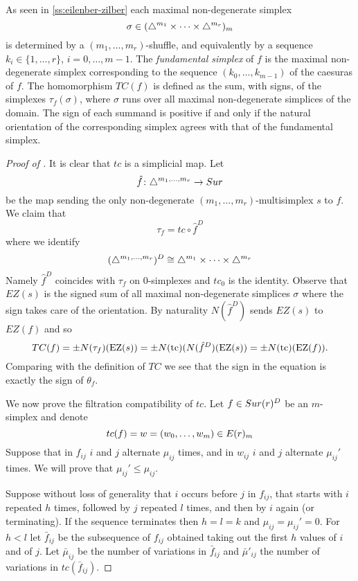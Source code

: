 As seen in \cref{ss:eilenber-zilber}
each maximal non-degenerate simplex  $$\sigma\in (\triangle^{m_1 }\times\dots\times\triangle^{m_r})_m $$ is  determined by a
$(m_1,\dots,m_r)$-shuffle, and equivalently by a sequence $k_i\in \{1,\dots ,r \}$, $i=0,\dots , m-1$.
The \textit{fundamental simplex} of $f$ is the
maximal non-degenerate simplex corresponding to the  sequence $(k_0,\dots, k_{m-1})$ of the caesuras of $f$.
The homomorphism $TC(f)$ is defined as the sum, with signs, of the simplexes
$\tau_f(\sigma)$, where $\sigma$ runs
over all maximal non-degenerate simplices of the domain. The sign of each summand is positive if and only if the natural orientation of the corresponding simplex agrees with that of the fundamental simplex.

\begin{proof}[Proof of ]
	It is clear that $tc$ is a simplicial map.
	Let
	\[
	\hat{f} \colon \triangle^{m_1,\dots,m_r} \to Sur
	\]
	be the map sending the only non-degenerate $(m_1,\dots,m_r)$-multisimplex $s$ to $f$. We claim that $$\tau_f = tc \circ \hat{f}^D$$ where we identify $$(\triangle^{m_1,\dots,m_r})^D \cong \triangle^{m_1}\times\dots\times\triangle^{m_r}$$  %
	Namely $\hat{f}^D$ coincides with $\tau_f$ on 0-simplexes and $tc_0$ is the identity.
	Observe that $EZ(s)$ is the signed sum of all maximal non-degenerate simplices $\sigma$ where the sign takes care of the orientation.
	By naturality $N(\hat{f}^D)$ sends $EZ(s)$ to $EZ(f)$ and so
	\[
	TC(f) = \pm N(\tau_f)(\operatorname{EZ}(s)) = \pm N(\operatorname{tc})(N(\hat{f}^D)(\operatorname{EZ}(s)) = \pm N(\operatorname{tc}) (\operatorname{EZ}(f)).
	\]
	Comparing with the definition of $TC$ we see that the sign in the equation is exactly the sign of $\theta_f$.

	We now prove the filtration compatibility of $tc$. Let $f\in Sur(r)^{D}$ be an $m$-simplex and denote $$tc(f)=w=(w_{0},\dots,w_{m})\in E(r)_{m}$$ Suppose that in $f_{ij}$ $i$ and $j$ alternate $\mu_{ij}$ times, and in $w_{ij}$ $i$ and $j$ alternate $\mu_{ij}'$ times.
	We will prove that
	$\mu_{ij}' \leq \mu_{ij}$.

	Suppose without loss of generality that $i$ occurs before $j$ in $f_{ij}$, that starts with $i$ repeated $h$ times, followed by $j$ repeated $l$ times, and then by $i$ again (or terminating).
	If the sequence terminates then $h=l=k$ and $\mu_{ij}=\mu_{ij}'=0$.
	For $h <l$ let $\bar{f}_{ij}$ be the subsequence of $f_{ij}$ obtained taking out the first $h$ values of $i$ and of $j$.
	Let $\bar{\mu}_{ij}$ be the number of variations in $\bar{f}_{ij}$
	and $\bar{\mu}'_{ij}$ the number of variations in $tc(\bar{f}_{ij})$.


\end{proof}
